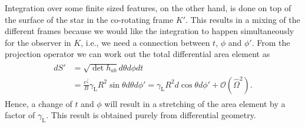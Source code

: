 \documentclass{aa}
\newcommand{\Ob}{\ensuremath{\hat{\Omega}}}
\newcommand{\zetab}{\ensuremath{\bar{\zeta}}}
\newcommand{\lgamma}{\gamma_{\text{L}}}
\begin{document}
Integration over some finite sized features, on the other hand, is done on top of the surface of the star in the co-rotating frame $K'$.
This results in a mixing of the different frames because we would like the integration to happen simultaneously for the observer in $K$, i.e., we need a connection between $t$, $\phi$ and $\phi'$.
From the projection operator we can work out the total differential area element as
\begin{align}\begin{split}\label{eq:dSp}
dS' &= \sqrt{\det h_{ab}} d\theta d\phi d t\\
&= \frac{e^{\zetab}}{B} \lgamma R^2 \sin\theta d\theta d\phi' = \lgamma R^2 d\cos\theta d\phi' + \mathcal{O}(\Ob^2).
\end{split}\end{align}
Hence, a change of $t$ and $\phi$  will result in a stretching of the area element by a factor of $\lgamma$.
This result is obtained purely from differential geometry.
\end{document}
